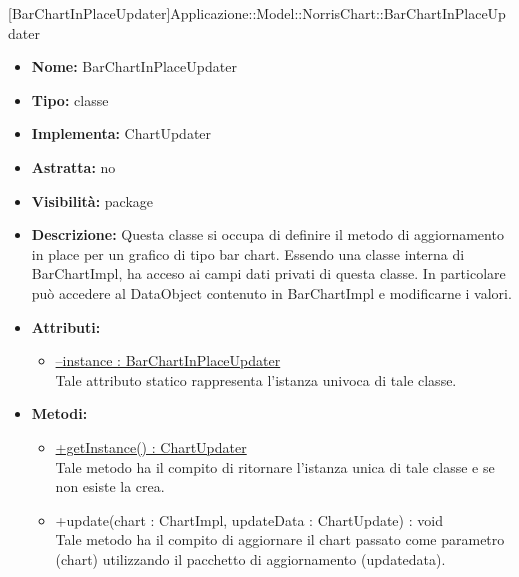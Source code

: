 			
			[BarChartInPlaceUpdater]{Applicazione::Model::NorrisChart::BarChartInPlaceUpdater}
			

	
			
			\begin{itemize}
			\item \textbf{Nome:} BarChartInPlaceUpdater
			\item \textbf{Tipo:} classe
			
		\item \textbf{Implementa:}
		ChartUpdater
		\item \textbf{Astratta:}
		no
			\item \textbf{Visibilità:} package
			\item \textbf{Descrizione:} Questa classe si occupa di definire il metodo di aggiornamento in place per un grafico di tipo bar chart. Essendo una classe interna di BarChartImpl, ha acceso ai campi dati privati di questa classe. In particolare può accedere al DataObject contenuto in BarChartImpl e modificarne i valori.
			\item \textbf{Attributi:}
				\begin{itemize}
				\setlength{\itemsep}{5pt}
				
					\item[\ding{111}] \underline{--instance : BarChartInPlaceUpdater} \\ [1mm] Tale attributo statico rappresenta l'istanza univoca di tale classe.
				\end{itemize}
		
			\item \textbf{Metodi:}
				\begin{itemize}
				\setlength{\itemsep}{5pt}
				
					\item[\ding{111}] {\underline{+getInstance() : ChartUpdater}} \\ [1mm] Tale metodo ha il compito di ritornare l'istanza unica di tale classe e se non esiste la crea.
					\item[\ding{111}] {{+update(chart : ChartImpl, updateData : ChartUpdate) : void}} \\ [1mm] Tale metodo ha il compito di aggiornare il chart passato come parametro (chart) utilizzando il pacchetto di aggiornamento (updatedata).
				\end{itemize}
		
			\end{itemize}

